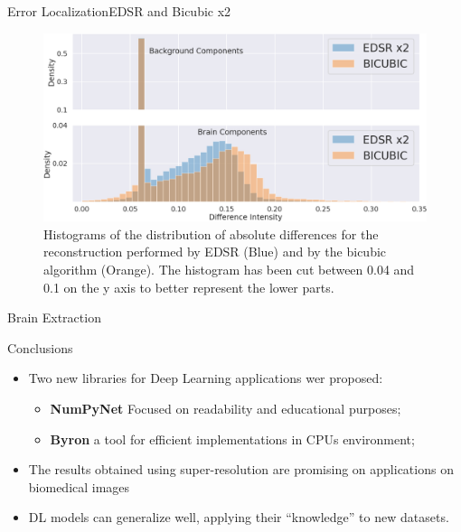 \documentclass[10pt, unicode]{beamer}
\begin{document}
\begin{frame}{Error Localization}{EDSR and Bicubic x2}

\begin{figure}
 \includegraphics[scale=0.2]{./images/histo-edsr.png}
 \caption{Histograms of the distribution of absolute differences for the reconstruction
performed by EDSR (Blue) and by the bicubic algorithm (Orange). The histogram has
been cut between 0.04 and 0.1 on the y axis to better represent the lower parts.}
\end{figure}

 
\end{frame}

\begin{frame}{Brain Extraction}
 
\end{frame}


\begin{frame}{Conclusions}
\Large
  \begin{itemize}
   \item Two new libraries for Deep Learning applications wer proposed:
   \begin{itemize}
      \item {\bf NumPyNet} Focused on readability and educational purposes;
      \item {\bf Byron} a tool for efficient implementations in CPUs environment;
   \end{itemize}
   \item The results obtained using super-resolution are promising on applications on biomedical images
   \item DL models can generalize well, applying their ``knowledge'' to new datasets. 
  \end{itemize}

  
\end{frame}
\end{document}

